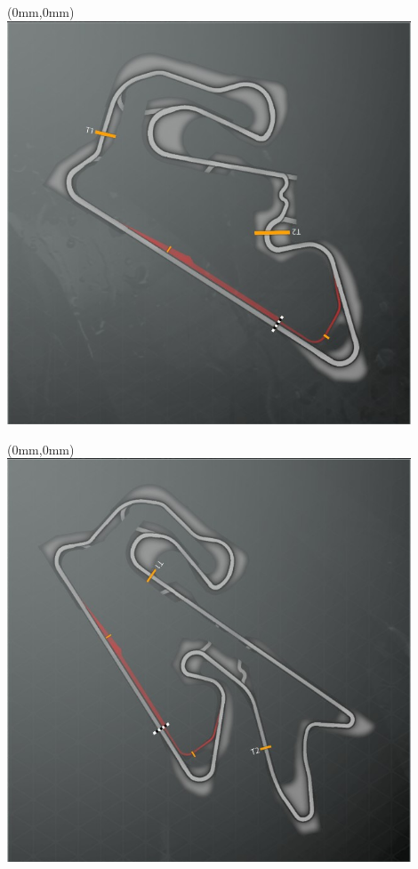\null\newpage
\begin{textblock*}{30mm}(0mm,0mm)%
\includegraphics[width=120mm]{TR/2015-05-20_00025.png}
\end{textblock*}
\null\newpage
\begin{textblock*}{30mm}(0mm,0mm)%
\includegraphics[width=120mm]{TR/2015-05-20_00024.png}
\end{textblock*}
